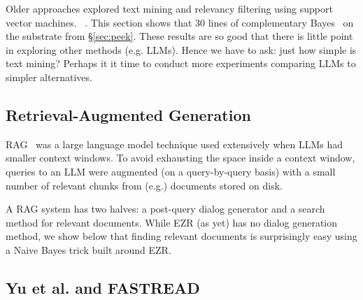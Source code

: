\documentclass[AMA,STIX2COL]{WileyNJDv5}
\begin{document}
Older
approaches explored text mining and relevancy filtering using
support vector machines. ~\cite{yu2018total,Yu2018}. This section shows
that 30 lines of complementary Bayes~\cite{rennie2003tackling}
on the substrate from \S\ref{sec:peek}. These results
are so good  that there is little point
in exploring other methods (e.g. LLMs). Hence we have to ask:
just how simple is text mining? Perhaps it it time
to conduct more experiments
comparing LLMs to simpler alternatives.



 \subsection{Retrieval-Augmented Generation} 
 RAG~\cite{lewis2020rag} was a large language model
 technique used extensively when LLMs
 had smaller context
 windows. To avoid exhausting the space
 inside a context window,
   queries to an LLM were 
augmented (on a query-by-query basis)
with a small number of relevant chunks
from (e.g.)  documents stored on disk. 

A RAG system has two halves: a post-query dialog generator and a
 search method for relevant documents. While EZR (as yet)
has no dialog generation method, we show below
that finding relevant documents is surprisingly easy using
a Naive Bayes trick built
around EZR.

\subsection{Yu et al. and FASTREAD}
\end{document}
